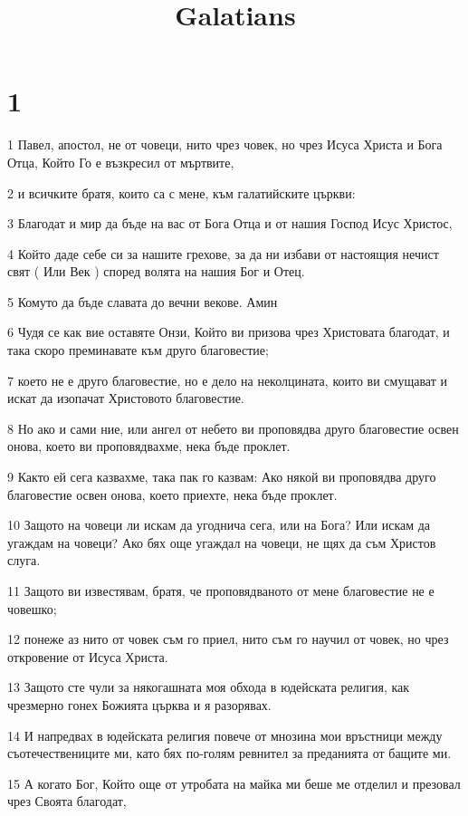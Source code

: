 

\title{Galatians}


\chapter{1}

\par 1 Павел, апостол, не от човеци, нито чрез човек, но чрез Исуса Христа и Бога Отца, Който Го е възкресил от мъртвите,
\par 2 и всичките братя, които са с мене, към галатийските църкви:
\par 3 Благодат и мир да бъде на вас от Бога Отца и от нашия Господ Исус Христос,
\par 4 Който даде себе си за нашите грехове, за да ни избави от настоящия нечист свят ( Или Век ) според волята на нашия Бог и Отец.
\par 5 Комуто да бъде славата до вечни векове. Амин
\par 6 Чудя се как вие оставяте Онзи, Който ви призова чрез Христовата благодат, и така скоро преминавате към друго благовестие;
\par 7 което не е друго благовестие, но е дело на неколцината, които ви смущават и искат да изопачат Христовото благовестие.
\par 8 Но ако и сами ние, или ангел от небето ви проповядва друго благовестие освен онова, което ви проповядвахме, нека бъде проклет.
\par 9 Както ей сега казвахме, така пак го казвам: Ако някой ви проповядва друго благовестие освен онова, което приехте, нека бъде проклет.
\par 10 Защото на човеци ли искам да угоднича сега, или на Бога? Или искам да угаждам на човеци? Ако бях още угаждал на човеци, не щях да съм Христов слуга.
\par 11 Защото ви известявам, братя, че проповядваното от мене благовестие не е човешко;
\par 12 понеже аз нито от човек съм го приел, нито съм го научил от човек, но чрез откровение от Исуса Христа.
\par 13 Защото сте чули за някогашната моя обхода в юдейската религия, как чрезмерно гонех Божията църква и я разорявах.
\par 14 И напредвах в юдейската религия повече от мнозина мои връстници между съотечествениците ми, като бях по-голям ревнител за преданията от бащите ми.
\par 15 А когато Бог, Който още от утробата на майка ми беше ме отделил и презовал чрез Своята благодат,
